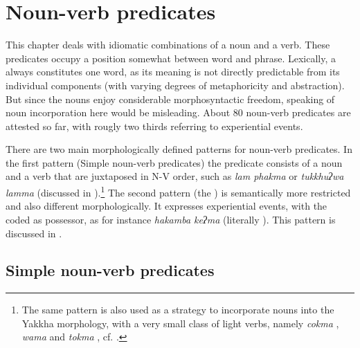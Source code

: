 
\chapter{Noun-verb predicates}\label{noun-verb}

This chapter deals with idiomatic combinations of a noun and a verb. These predicates occupy a position somewhat between word and phrase. Lexically, a  always constitutes one word, as its meaning is not directly predictable from its individual components (with varying degrees of metaphoricity and abstraction). But since the nouns enjoy considerable morphosyntactic freedom, speaking of  noun incorporation here would be misleading. About 80 noun-verb predicates are attested so far, with rougly two thirds referring to experiential events.

There are two main morphologically defined patterns for noun-verb predicates. In the first pattern (Simple noun-verb predicates) the predicate consists of a noun and a verb that are juxtaposed in N-V order, such as \emph{lam phakma}  or \emph{tukkhuʔwa lamma}   (discussed in ).\footnote{The same pattern is also used as a strategy to incorporate  nouns into the Yakkha morphology, with a very small class of light verbs, namely \emph{cokma} , \emph{wama}  and \emph{tokma} , cf. . } The second pattern (the ) is semantically more restricted and also  different morphologically. It expresses experiential events, with the  coded as possessor, as for instance \emph{hakamba keʔma}  (literally ). This pattern is discussed in . 

\section{Simple noun-verb predicates}\label{simple-noun-verb}

